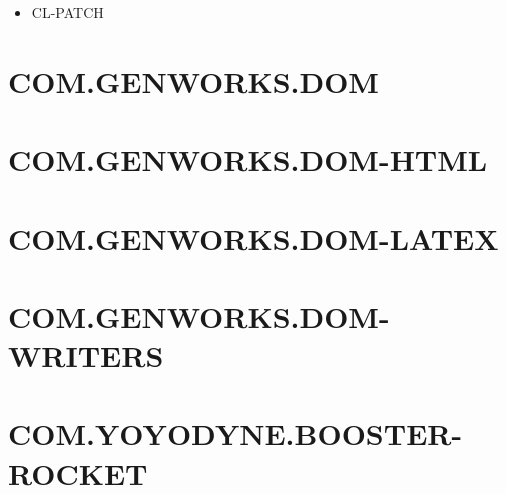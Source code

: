 \documentclass [11pt]{book}
\begin{document}
\label{subsec:functionandmacrodefinitions}



\begin{itemize}

\item {}CL-PATCH





\end{itemize}





\section{COM.GENWORKS.DOM }

\label{sec:com.genworks.dom}







\section{COM.GENWORKS.DOM-HTML }

\label{sec:com.genworks.dom-html}







\section{COM.GENWORKS.DOM-LATEX }

\label{sec:com.genworks.dom-latex}







\section{COM.GENWORKS.DOM-WRITERS }

\label{sec:com.genworks.dom-writers}







\section{COM.YOYODYNE.BOOSTER-ROCKET }

\label{sec:com.yoyodyne.booster-rocket}
\end{document}
